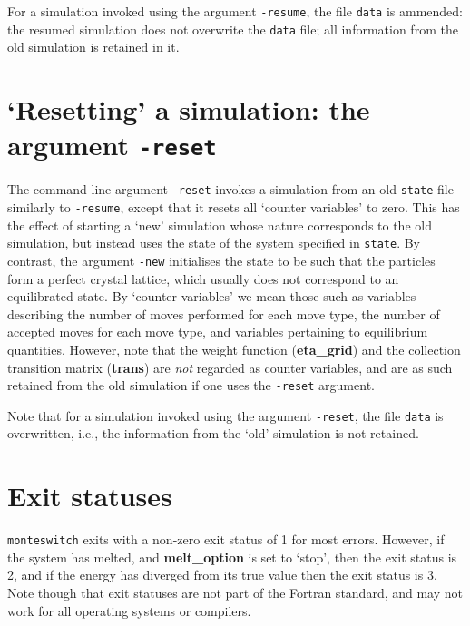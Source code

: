 \documentclass{report}
\begin{document}
For a simulation invoked using the argument \texttt{-resume}, the file \texttt{data} is ammended: the resumed simulation does not overwrite the
\texttt{data} file; all information from the old simulation is retained in it.

\section{`Resetting' a simulation: the argument \texttt{-reset}}\label{sec:reset}
The command-line argument \texttt{-reset} invokes a simulation from an old \texttt{state} file similarly to \texttt{-resume}, except that it
resets all `counter variables' to zero. This has the effect of starting a `new' simulation whose nature corresponds to the old simulation, 
but instead uses the state of the system specified in \texttt{state}. By contrast, the argument \texttt{-new} initialises the 
state to be such that the particles form a perfect crystal lattice, which usually does not correspond to an equilibrated state.
By `counter variables' we mean those such as variables describing the number of moves performed for each move type, the number of accepted moves 
for each move type, and variables pertaining to equilibrium quantities. However, note that the weight function (\textbf{eta\_grid}) and the
collection transition matrix (\textbf{trans}) are \emph{not} regarded as counter variables, and are as such retained from the old simulation
if one uses the \texttt{-reset} argument.

Note that for a simulation invoked using the argument \texttt{-reset}, the file \texttt{data} is overwritten, i.e., the information from the `old'
simulation is not retained.


\section{Exit statuses}
\texttt{monteswitch} exits with a non-zero exit status of 1 for most errors. However, if the system has melted, and \textbf{melt\_option} is set to
`stop', then the exit status is 2, and if the energy has diverged from its true value then the exit status is 3. 
Note though that exit statuses are not part of the Fortran standard, and may not work for all operating systems or compilers. 
\end{document}
